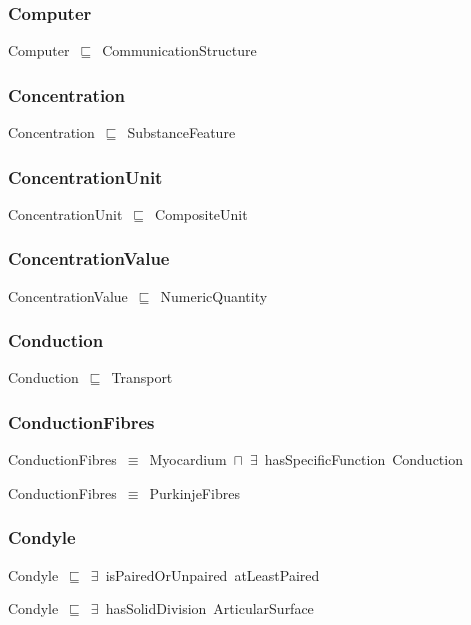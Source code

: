 \documentclass{article}
\begin{document}
\subsubsection*{Computer}

Computer~\ensuremath{\sqsubseteq}~CommunicationStructure~

\subsubsection*{Concentration}

Concentration~\ensuremath{\sqsubseteq}~SubstanceFeature~

\subsubsection*{ConcentrationUnit}

ConcentrationUnit~\ensuremath{\sqsubseteq}~CompositeUnit~

\subsubsection*{ConcentrationValue}

ConcentrationValue~\ensuremath{\sqsubseteq}~NumericQuantity~

\subsubsection*{Conduction}

Conduction~\ensuremath{\sqsubseteq}~Transport~

\subsubsection*{ConductionFibres}

ConductionFibres~\ensuremath{\equiv}~Myocardium~\ensuremath{\sqcap}~\ensuremath{\exists}~hasSpecificFunction~Conduction

ConductionFibres~\ensuremath{\equiv}~PurkinjeFibres

\subsubsection*{Condyle}

Condyle~\ensuremath{\sqsubseteq}~\ensuremath{\exists}~isPairedOrUnpaired~atLeastPaired~

Condyle~\ensuremath{\sqsubseteq}~\ensuremath{\exists}~hasSolidDivision~ArticularSurface~
\end{document}
